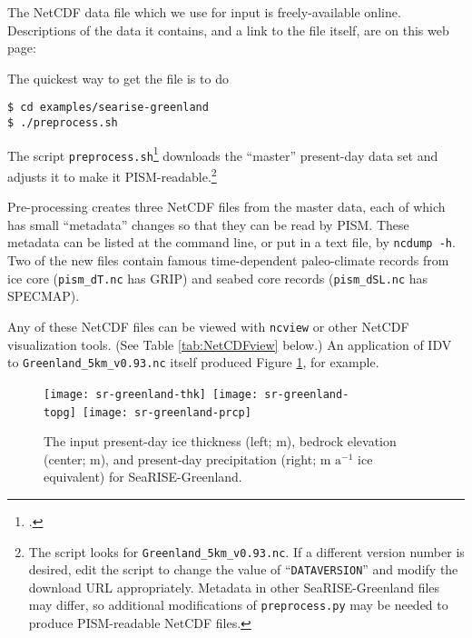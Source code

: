 The NetCDF data file which we use for input is freely-available online.  Descriptions of the data it contains, and a link to the file itself, are on this web page: 
\medskip

\centerline{}
\medskip

\noindent The quickest way to get the file is to do
\begin{verbatim}
$ cd examples/searise-greenland
$ ./preprocess.sh
\end{verbatim}
\noindent The script \texttt{preprocess.sh}\footnote{.} downloads the ``master'' present-day data set and adjusts it to make it PISM-readable.\footnote{The script looks for \texttt{Greenland\_5km\_v0.93.nc}.  If a different version number is desired, edit the script to change the value of ``\texttt{DATAVERSION}'' and modify the download URL appropriately.  Metadata in other SeaRISE-Greenland files may differ, so additional modifications of \texttt{preprocess.py} may be needed to produce PISM-readable NetCDF files.}

Pre-processing creates three NetCDF files from the master data, each of which has small ``metadata'' changes so that they can be read by PISM.  These metadata can be listed at the command line, or put in a text file, by \texttt{ncdump -h}.  Two of the new files contain famous time-dependent paleo-climate records from ice core (\texttt{pism_dT.nc} has GRIP) and seabed core records (\texttt{pism_dSL.nc} has SPECMAP).

Any of these NetCDF files can be viewed with \texttt{ncview} or other NetCDF visualization tools.  (See Table \ref{tab:NetCDFview} below.)  An application of IDV to \texttt{Greenland_5km_v0.93.nc} itself produced Figure \ref{fig:sr-input}, for example.

\begin{figure}[ht]
\centering
\mbox{\texttt{[image: sr-greenland-thk]}
  \qquad
  \texttt{[image: sr-greenland-topg]}
  \qquad
  \texttt{[image: sr-greenland-prcp]}}
\caption{The input present-day ice thickness (left; m), bedrock elevation (center; m), and present-day precipitation (right; m $\text{a}^{-1}$ ice equivalent) for SeaRISE-Greenland.}
\label{fig:sr-input}
\end{figure}


